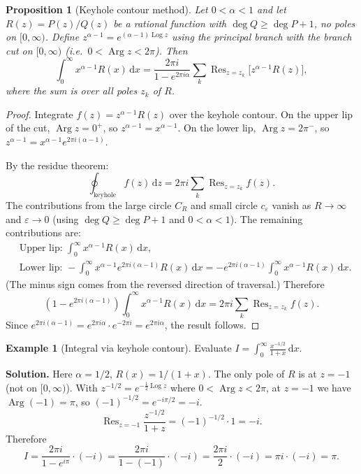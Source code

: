 \documentclass[12pt,a4paper,openany]{book}
\theoremstyle{definition}
\newtheorem{example}[definition]{Example}
\theoremstyle{plain}
\newtheorem{proposition}[definition]{Proposition}
\theoremstyle{remark}
\DeclareMathOperator{\Arg}{Arg}
\DeclareMathOperator{\Log}{Log}
\DeclareMathOperator{\Res}{Res}
\newcommand{\dd}{\mathrm{d}}
\begin{document}
\begin{proposition}[Keyhole contour method]\label{prop:keyhole}
Let $0<\alpha<1$ and let $R(z)=P(z)/Q(z)$ be a rational function with
$\deg Q\geq\deg P+1$, no poles on $[0,\infty)$.
Define $z^{\alpha-1}=e^{(\alpha-1)\Log z}$ using the principal branch
with the branch cut on $[0,\infty)$ (i.e.\ $0<\Arg z<2\pi$).  Then
\[
  \int_0^{\infty}x^{\alpha-1}R(x)\,\dd x
  =\frac{2\pi i}{1-e^{2\pi i\alpha}}
  \sum_{k}\Res_{z=z_k}\bigl[z^{\alpha-1}R(z)\bigr],
\]
where the sum is over all poles $z_k$ of $R$.
\end{proposition}

\begin{proof}
Integrate $f(z)=z^{\alpha-1}R(z)$ over the keyhole contour.
On the upper lip of the cut, $\Arg z=0^+$, so $z^{\alpha-1}
=x^{\alpha-1}$.
On the lower lip, $\Arg z=2\pi^-$, so $z^{\alpha-1}
=x^{\alpha-1}e^{2\pi i(\alpha-1)}$.

By the residue theorem:
\[
  \oint_{\text{keyhole}}f(z)\,\dd z
  =2\pi i\sum_k\Res_{z=z_k}f(z).
\]
The contributions from the large circle $C_R$ and small circle
$c_\varepsilon$ vanish as $R\to\infty$ and $\varepsilon\to 0$
(using $\deg Q\geq\deg P+1$ and $0<\alpha<1$).
The remaining contributions are:
\begin{align*}
  &\text{Upper lip: }\int_0^{\infty}x^{\alpha-1}R(x)\,\dd x,\\
  &\text{Lower lip: }-\int_0^{\infty}x^{\alpha-1}
    e^{2\pi i(\alpha-1)}R(x)\,\dd x
  =-e^{2\pi i(\alpha-1)}\int_0^{\infty}x^{\alpha-1}R(x)\,\dd x.
\end{align*}
(The minus sign comes from the reversed direction of traversal.)
Therefore
\[
  (1-e^{2\pi i(\alpha-1)})\int_0^{\infty}x^{\alpha-1}R(x)\,\dd x
  =2\pi i\sum_k\Res_{z=z_k}f(z).
\]
Since $e^{2\pi i(\alpha-1)}=e^{2\pi i\alpha}\cdot e^{-2\pi i}
=e^{2\pi i\alpha}$, the result follows.
\end{proof}

\begin{example}[Integral via keyhole contour]\label{ex:keyhole-1}
Evaluate $\displaystyle I=\int_0^{\infty}\frac{x^{-1/2}}{1+x}\,\dd x$.

\medskip\noindent\textbf{Solution.}
Here $\alpha=1/2$, $R(x)=1/(1+x)$.  The only pole of $R$ is at $z=-1$
(not on $[0,\infty)$).  With $z^{-1/2}=e^{-\frac{1}{2}\Log z}$ where
$0<\Arg z<2\pi$, at $z=-1$ we have $\Arg(-1)=\pi$, so
$(-1)^{-1/2}=e^{-i\pi/2}=-i$.
\[
  \Res_{z=-1}\frac{z^{-1/2}}{1+z}=(-1)^{-1/2}\cdot 1=-i.
\]
Therefore
\[
  I=\frac{2\pi i}{1-e^{i\pi}}\cdot(-i)
  =\frac{2\pi i}{1-(-1)}\cdot(-i)
  =\frac{2\pi i}{2}\cdot(-i)
  =\pi i\cdot(-i)=\pi.
\]
\end{example}
\end{document}
